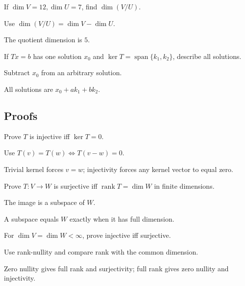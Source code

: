 \begin{exercise}\label{exr:i06-expand-04}
If \(\dim V=12,\dim U=7\), find \(\dim(V/U)\).
\end{exercise}
\begin{hint}
Use \(\dim(V/U)=\dim V-\dim U\).
\end{hint}
\begin{solution}
The quotient dimension is \(5\).
\end{solution}

\begin{exercise}\label{exr:i06-expand-05}
If \(Tx=b\) has one solution \(x_0\) and \(\ker T=\operatorname{span}\{k_1,k_2\}\), describe all solutions.
\end{exercise}
\begin{hint}
Subtract \(x_0\) from an arbitrary solution.
\end{hint}
\begin{solution}
All solutions are \(x_0+ak_1+bk_2\).
\end{solution}

\subsection*{Proofs}

\begin{exercise}\label{exr:i06-expand-06}
Prove \(T\) is injective iff \(\ker T=0\).
\end{exercise}
\begin{hint}
Use \(T(v)=T(w)\iff T(v-w)=0\).
\end{hint}
\begin{solution}
Trivial kernel forces \(v=w\); injectivity forces any kernel vector to equal zero.
\end{solution}

\begin{exercise}\label{exr:i06-expand-07}
Prove \(T:V\to W\) is surjective iff \(\operatorname{rank}T=\dim W\) in finite dimensions.
\end{exercise}
\begin{hint}
The image is a subspace of \(W\).
\end{hint}
\begin{solution}
A subspace equals \(W\) exactly when it has full dimension.
\end{solution}

\begin{exercise}\label{exr:i06-expand-08}
For \(\dim V=\dim W<\infty\), prove injective iff surjective.
\end{exercise}
\begin{hint}
Use rank-nullity and compare rank with the common dimension.
\end{hint}
\begin{solution}
Zero nullity gives full rank and surjectivity; full rank gives zero nullity and injectivity.
\end{solution}

